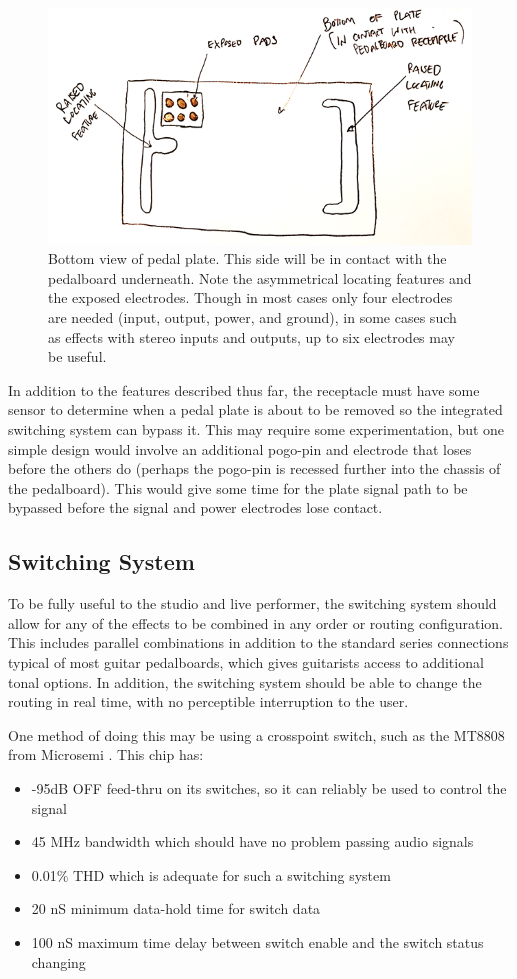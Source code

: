 \documentclass{article}
\begin{document}
\begin{figure}
    \centering
    \includegraphics[width = 0.6 \textwidth]{plate_bottom_img}
    \caption{Bottom view of pedal plate.  This side will be in contact with the pedalboard underneath.  Note the asymmetrical locating features and the exposed electrodes.  Though in most cases only four electrodes are needed (input, output, power, and ground), in some cases such as effects with stereo inputs and outputs, up to six electrodes may be useful.}
    \label{fig:plate_bottom}
\end{figure}

In addition to the features described thus far, the receptacle must have some sensor to determine when a pedal plate is about to be removed so the integrated switching system can bypass it.  This may require some experimentation, but one simple design would involve an additional pogo-pin and electrode that loses before the others do (perhaps the pogo-pin is recessed further into the chassis of the pedalboard).  This would give some time for the plate signal path to be bypassed before the signal and power electrodes lose contact.

\subsection{Switching System}

To be fully useful to the studio and live performer, the switching system should allow for any of the effects to be combined in any order or routing configuration.  This includes parallel combinations in addition to the standard series connections typical of most guitar pedalboards, which gives guitarists access to additional tonal options.  In addition, the switching system should be able to change the routing in real time, with no perceptible interruption to the user.

One method of doing this may be using a crosspoint switch, such as the MT8808 from Microsemi \cite{Zarlink:MT8808}.  This chip has:

\begin{itemize}
    \item -95dB OFF feed-thru on its switches, so it can reliably be used to control the signal
    \item 45 MHz bandwidth which should have no problem passing audio signals
    \item 0.01\% THD which is adequate for such a switching system
    \item 20 nS minimum data-hold time for switch data
    \item 100 nS maximum time delay between switch enable and the switch status changing
\end{itemize}
\end{document}
